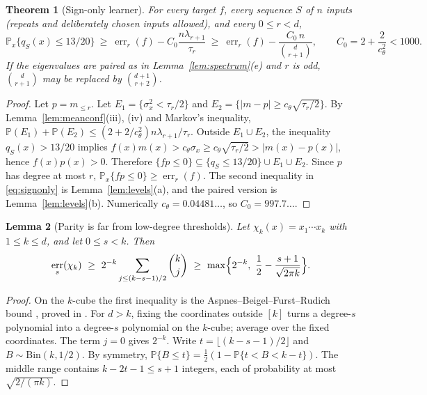 \documentclass[11pt]{article}
\newtheorem{theorem}{Theorem}[section]
\newtheorem{lemma}[theorem]{Lemma}
\theoremstyle{definition}\newtheorem{assumption}[theorem]{Assumption}
\theoremstyle{remark}\newtheorem{remark}[theorem]{Remark}
\DeclareMathOperator{\err}{err}
\newcommand{\Pp}{\mathbb P}
\begin{document}
\begin{theorem}[Sign-only learner]\label{thm:signonly}
For every target $f$, every sequence $S$ of $n$ inputs (repeats and
deliberately chosen inputs allowed), and every $0\le r<d$,
\begin{equation}\label{eq:signonly}
 \Pp_x\{q_S(x)\le13/20\}\ \ge\ \err_r(f)-C_0\frac{n\lambda_{r+1}}{\tau_r}
 \ \ge\ \err_r(f)-\frac{C_0\,n}{\binom d{r+1}},
 \qquad C_0=2+\frac2{c_\theta^2}<1000 .
\end{equation}
If the eigenvalues are paired as in Lemma~\ref{lem:spectrum}(e) and $r$ is
odd, $\binom d{r+1}$ may be replaced by $\binom{d+1}{r+2}$.
\end{theorem}
\begin{proof}
Let $p=m_{\le r}$. Let $E_1=\{\sigma_x^2<\tau_r/2\}$ and
$E_2=\{|m-p|\ge c_\theta\sqrt{\tau_r/2}\}$. By Lemma~\ref{lem:meanconf}(iii),
(iv) and Markov's inequality,
$\Pp(E_1)+\Pp(E_2)\le(2+2/c_\theta^2)n\lambda_{r+1}/\tau_r$. Outside
$E_1\cup E_2$, the inequality $q_S(x)>13/20$ implies
$f(x)m(x)>c_\theta\sigma_x\ge c_\theta\sqrt{\tau_r/2}>|m(x)-p(x)|$, hence
$f(x)p(x)>0$. Therefore
$\{fp\le0\}\subseteq\{q_S\le13/20\}\cup E_1\cup E_2$. Since $p$ has degree at
most $r$, $\Pp_x\{fp\le0\}\ge\err_r(f)$. The second inequality in
\eqref{eq:signonly} is Lemma~\ref{lem:levels}(a), and the paired version is
Lemma~\ref{lem:levels}(b). Numerically $c_\theta=0.04481\ldots$, so
$C_0=997.7\ldots$.
\end{proof}

\begin{lemma}[Parity is far from low-degree thresholds]\label{lem:abfr}
Let $\chi_k(x)=x_1\cdots x_k$ with $1\le k\le d$, and let $0\le s<k$. Then
\[
 \err_s(\chi_k)\ \ge\ 2^{-k}\sum_{j\le(k-s-1)/2}\binom kj
 \ \ge\ \max\Bigl\{2^{-k},\ \frac12-\frac{s+1}{\sqrt{2\pi k}}\Bigr\}.
\]
\end{lemma}
\begin{proof}
On the $k$-cube the first inequality is the Aspnes--Beigel--Furst--Rudich
bound \cite{ABFR}, proved in \cite[Lemma~6.2]{subcritical}. For $d>k$,
fixing the coordinates outside $[k]$ turns a degree-$s$ polynomial into a
degree-$s$ polynomial on the $k$-cube; average over the fixed
coordinates. The term $j=0$ gives $2^{-k}$. Write
$t=\lfloor(k-s-1)/2\rfloor$ and $B\sim\mathrm{Bin}(k,1/2)$. By symmetry,
$\Pp\{B\le t\}=\tfrac12(1-\Pp\{t<B<k-t\})$. The middle range contains
$k-2t-1\le s+1$ integers, each of probability at most $\sqrt{2/(\pi k)}$.
\end{proof}
\end{document}
